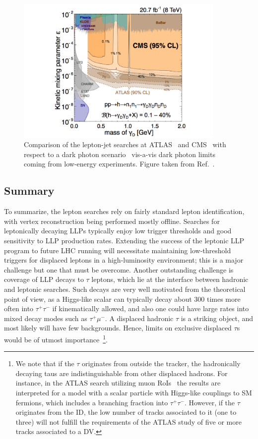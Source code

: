 \begin{figure}[htb]
\centering
\includegraphics[width=0.9\textwidth]{plots/Limit_Eps_mass_v6.pdf}
\caption{Comparison of the lepton-jet searches at ATLAS~\cite{Aad:2014yea} and CMS~\cite{Khachatryan:2015wka} with respect to a dark photon scenario~\cite{Falkowski:2010cm} vis-a-vis dark photon limits coming from low-energy experiments. Figure taken from Ref.~\cite{Khachatryan:2015wka}.}
\label{fig:dark_photons_CMS_ATLAS}
\end{figure}

\subsection{Summary}
\label{sec:leptonicsummary}

To summarize, the lepton searches rely on fairly standard lepton identification, with vertex reconstruction being performed mostly offline. Searches for leptonically decaying LLPs typically enjoy low trigger thresholds and good sensitivity to LLP production rates. Extending the success of the leptonic LLP program to future LHC running will necessitate maintaining low-threshold triggers for displaced leptons in a high-luminosity environment; this is a major challenge but one that must be overcome. Another outstanding challenge is coverage of LLP decays to $\tau$ leptons, which lie at the interface between hadronic and leptonic searches. Such decays are very well motivated from the theoretical point of view, as a Higgs-like scalar can typically decay about 300 times more often into $\tau^+ \tau^-$ if kinematically allowed, and also one could have large rates into mixed decay modes such as $\tau^+ \mu^-$. A displaced hadronic $\tau$ is a striking object, and most likely will have few backgrounds. Hence, limits on exclusive displaced $\tau$s would be of utmost importance~\footnote{We note that if the $\tau$ originates from outside the tracker, the hadronically decaying taus are indistinguishable from other displaced hadrons. For instance, in the ATLAS search utilizing muon RoIs~\cite{Aad:2015uaa} the results are interpreted for a model with a scalar particle with Higgs-like couplings to SM fermions, which includes a branching fraction into $\tau^+ \tau^-$. However, if the $\tau$ originates from the ID, the low number of tracks associated to it (one to three) will not fulfill the requirements of the ATLAS study of five or more tracks associated to a DV.}.

